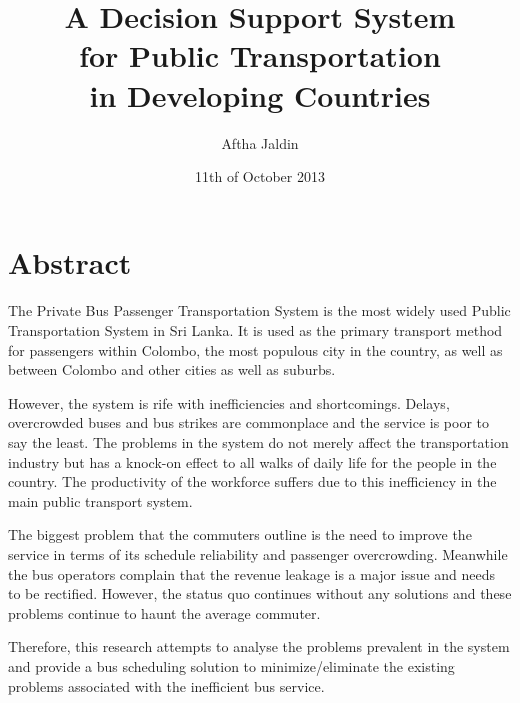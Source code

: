 \documentclass[12pt, oneside]{report}
\title{
A Decision Support System
\\ for Public Transportation
\\ in Developing Countries
}
\author{Aftha Jaldin}
\date{11th of October 2013}
\begin{document}
\maketitle

\tableofcontents
\newpage
{}

\listoffigures
\newpage

\listoftables
\newpage

\section*{Abstract}

\paragraph{ } The Private Bus Passenger Transportation System is the most widely used Public Transportation System in Sri Lanka. It is used as the primary transport method for passengers within Colombo, the most populous city in the country, as well as between Colombo and other cities as well as suburbs.

However, the system is rife with inefficiencies and shortcomings. Delays, overcrowded buses and bus strikes are commonplace and the service is poor to say the least. The problems in the system do not merely affect the transportation industry but has a knock-on effect to all walks of daily life for the people in the country. The productivity of the workforce suffers due to this inefficiency in the main public transport system.

The biggest problem that the commuters outline is the need to improve the service in terms of its schedule reliability and passenger overcrowding. Meanwhile the bus operators complain that the revenue leakage is a major issue and needs to be rectified. However, the status quo continues without any solutions and these problems continue to haunt the average commuter.

Therefore, this research attempts to analyse the problems prevalent in the system and provide a bus scheduling solution to minimize/eliminate the existing problems associated with the inefficient bus service.

\newpage
\end{document}
